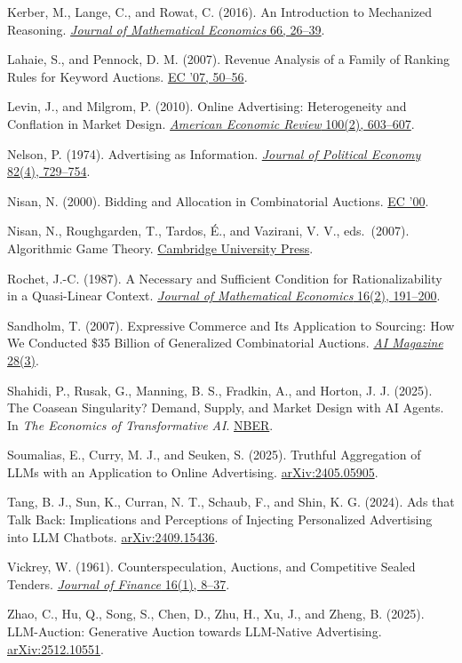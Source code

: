 Kerber, M., Lange, C., and Rowat, C. (2016). An Introduction to
Mechanized Reasoning.
\href{https://doi.org/10.1016/j.jmateco.2016.06.005}{\emph{Journal of
Mathematical Economics} 66, 26--39}.

Lahaie, S., and Pennock, D. M. (2007). Revenue Analysis of a Family of
Ranking Rules for Keyword Auctions.
\href{https://doi.org/10.1145/1250910.1250918}{EC '07, 50--56}.

Levin, J., and Milgrom, P. (2010). Online Advertising: Heterogeneity and
Conflation in Market Design.
\href{https://web.stanford.edu/~jdlevin/Papers/OnlineAds.pdf}{\emph{American
Economic Review} 100(2), 603--607}.

Nelson, P. (1974). Advertising as Information.
\href{https://www.journals.uchicago.edu/doi/abs/10.1086/260231}{\emph{Journal
of Political Economy} 82(4), 729--754}.

Nisan, N. (2000). Bidding and Allocation in Combinatorial Auctions.
\href{https://doi.org/10.1145/352871.352872}{EC '00}.

Nisan, N., Roughgarden, T., Tardos, É., and Vazirani, V. V.,
eds.~(2007). Algorithmic Game Theory.
\href{https://doi.org/10.1017/CBO9780511800481}{Cambridge University
Press}.

Rochet, J.-C. (1987). A Necessary and Sufficient Condition for
Rationalizability in a Quasi-Linear Context.
\href{https://doi.org/10.1016/0304-4068(87)90007-3}{\emph{Journal of
Mathematical Economics} 16(2), 191--200}.

Sandholm, T. (2007). Expressive Commerce and Its Application to
Sourcing: How We Conducted \$35 Billion of Generalized Combinatorial
Auctions.
\href{https://ojs.aaai.org/aimagazine/index.php/aimagazine/article/view/2054}{\emph{AI
Magazine} 28(3)}.

Shahidi, P., Rusak, G., Manning, B. S., Fradkin, A., and Horton, J. J.
(2025). The Coasean Singularity? Demand, Supply, and Market Design with
AI Agents. In \emph{The Economics of Transformative AI}.
\href{https://www.nber.org/books-and-chapters/economics-transformative-ai/coasean-singularity-demand-supply-and-market-design-ai-agents}{NBER}.

Soumalias, E., Curry, M. J., and Seuken, S. (2025). Truthful Aggregation
of LLMs with an Application to Online Advertising.
\href{https://arxiv.org/abs/2405.05905}{arXiv:2405.05905}.

Tang, B. J., Sun, K., Curran, N. T., Schaub, F., and Shin, K. G. (2024).
Ads that Talk Back: Implications and Perceptions of Injecting
Personalized Advertising into LLM Chatbots.
\href{https://arxiv.org/abs/2409.15436}{arXiv:2409.15436}.

Vickrey, W. (1961). Counterspeculation, Auctions, and Competitive Sealed
Tenders. \href{https://doi.org/10.2307/2977633}{\emph{Journal of
Finance} 16(1), 8--37}.

Zhao, C., Hu, Q., Song, S., Chen, D., Zhu, H., Xu, J., and Zheng, B.
(2025). LLM-Auction: Generative Auction towards LLM-Native Advertising.
\href{https://arxiv.org/abs/2512.10551}{arXiv:2512.10551}.
